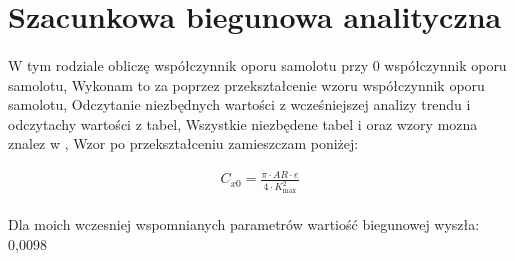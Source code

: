 \clearpage
\section{Szacunkowa biegunowa analityczna}
    
    \paragraph{}
        W tym rodziale obliczę współczynnik oporu samolotu przy 0 współczynnik oporu samolotu,
        Wykonam to za poprzez przekształcenie wzoru współczynnik oporu samolotu,
        Odczytanie niezbędnych wartości z wcześniejszej analizy trendu i odczytachy wartości z tabel,
        Wszystkie niezbędene tabel i oraz wzory mozna znalez w \cite{galinski}, 
        Wzor po przekształceniu zamieszczam poniżej:

        \begin{align}
            C_{x0} = \frac{\pi \cdot AR \cdot e}{4 \cdot K_{\max}^2}
        \end{align}

    \paragraph{}
        Dla moich wczesniej wspomnianych parametrów wartiość biegunowej wyszła: 0,0098